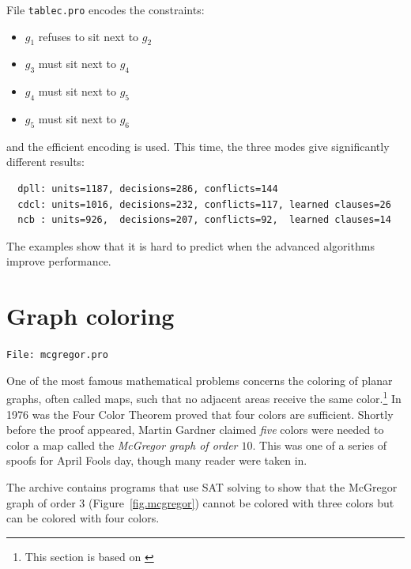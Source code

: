 \documentclass[11pt]{report}
\newcommand*{\p}[1]{\textup{\texttt{#1}}}
\newcommand*{\fl}[1]{\parbox{\textwidth}{\raggedleft \p{File: #1}}}
\begin{document}
File \p{tablec.pro} encodes the constraints:
\begin{itemize}
\item $g_1$ refuses to sit next to $g_2$
\item $g_3$ must  sit next to $g_4$
\item $g_4$ must  sit next to $g_5$
\item $g_5$ must  sit next to $g_6$ 
\end{itemize}
and the efficient encoding is used. This time, the three modes give
significantly different results:
\begin{verbatim}
  dpll: units=1187, decisions=286, conflicts=144
  cdcl: units=1016, decisions=232, conflicts=117, learned clauses=26
  ncb : units=926,  decisions=207, conflicts=92,  learned clauses=14
\end{verbatim}

The examples show that it is hard to predict when the advanced
algorithms improve performance.



\section{Graph coloring}\label{s.graph-color}

\fl{mcgregor.pro}

One of the most famous mathematical problems concerns the coloring of planar graphs, often called maps, such that no adjacent areas receive the same color.\footnote{This section is based on \cite[pp. 7, 134]{knuth-sat}} In 1976 was the Four Color Theorem proved that four colors are sufficient. Shortly before the proof appeared, Martin Gardner claimed \emph{five} colors were needed to color a map called the \emph{McGregor graph of order $10$}. This was one of a series of spoofs for April Fools day, though many reader were taken in.

The archive contains programs that use SAT solving to show that the McGregor graph of order $3$ (Figure~\ref{fig.mcgregor}) cannot be colored with three colors but can be colored with four colors.
\end{document}
